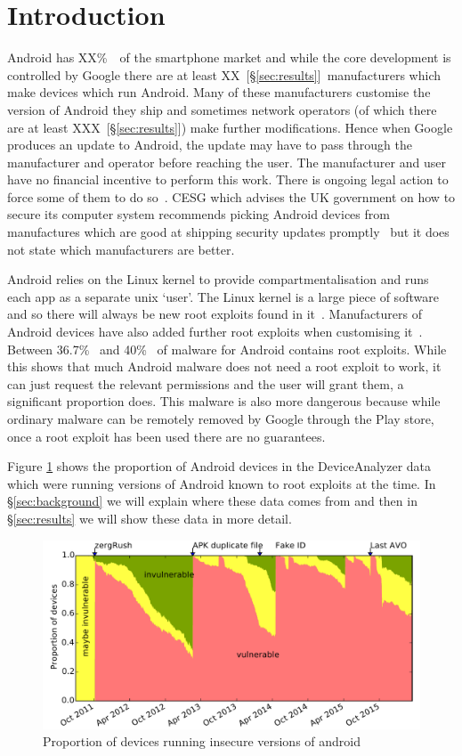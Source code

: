 \documentclass[conference,a4paper,twoside]{IEEEtran}
\newcommand{\percMarketShare}{XX\%~\cite{TODO}}
\newcommand{\daNumManufacturers}{XX~[\S\ref{sec:results}]}
\newcommand{\daNumNetworkOperators}{XXX~[\S\ref{sec:results}]}
\begin{document}
\section{Introduction}
Android has \percMarketShare\ of the smartphone market and while the core development is controlled by Google there are at least \daNumManufacturers\ manufacturers which make devices which run Android.
Many of these manufacturers customise the version of Android they ship and sometimes network operators (of which there are at least \daNumNetworkOperators) make further modifications.
Hence when Google produces an update to Android, the update may have to pass through the manufacturer and operator before reaching the user.
The manufacturer and user have no financial incentive to perform this work.
There is ongoing legal action to force some of them to do so~\cite{Soghoian2013}.
CESG which advises the UK government on how to secure its computer system recommends picking Android devices from manufactures which are good at shipping security updates promptly~\cite{CESG2013} but it does not state which manufacturers are better.

Android relies on the Linux kernel to provide compartmentalisation and runs each app as a separate unix `user'.
The Linux kernel is a large piece of software and so there will always be new root exploits found in it~\cite{TODO}.
Manufacturers of Android devices have also added further root exploits when customising it~\cite{Grace2012}.
Between 36.7\%~\cite{Zhou2012b} and 40\%~\cite{Zhou2012a} of malware for Android contains root exploits.
While this shows that much Android malware does not need a root exploit to work, it can just request the relevant permissions and the user will grant them, a significant proportion does.
This malware is also more dangerous because while ordinary malware can be remotely removed by Google through the Play store, once a root exploit has been used there are no guarantees.

Figure \ref{fig:proportioninsecure} shows the proportion of Android devices in the DeviceAnalyzer data which were running versions of Android known to root exploits at the time.
In \S\ref{sec:background} we will explain where these data comes from and then in \S\ref{sec:results} we will show these data in more detail.


\begin{figure}[!b]
\centering
\includegraphics[width=\columnwidth]{figures/proportioninsecure}
\caption{Proportion of devices running insecure versions of android}
\label{fig:proportioninsecure}
\end{figure}
\end{document}

